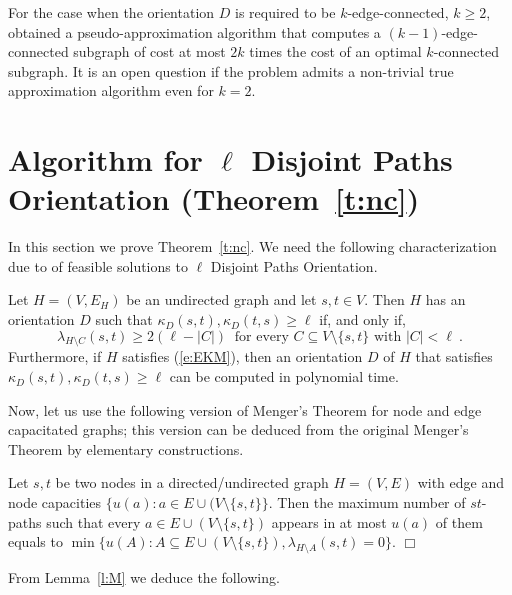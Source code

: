 \documentclass[envcountsame]{llncs}
\begin{document}
For the case when the orientation $D$ is required to be 
$k$-edge-connected, $k \geq 2$, \cite{KNS} obtained a pseudo-approximation algorithm 
that computes a $(k-1)$-edge-connected subgraph of cost at most $2k$ times the cost 
of an optimal $k$-connected subgraph.
It is an open question if the problem admits a non-trivial true approximation 
algorithm even for $k=2$.

\section{Algorithm for {\sf $\ell$ Disjoint Paths Orientation} (Theorem~\ref{t:nc})} \label{s:nc}

In this section we prove Theorem~\ref{t:nc}.
We need the following characterization due to \cite{EKM} 
of feasible solutions to {\sf $\ell$ Disjoint Paths Orientation}.

\begin{theorem}  \label{t:EKM}
Let $H=(V,E_H)$ be an undirected graph and let $s,t \in V$. 
Then $H$ has an orientation $D$ such that 
$\kappa_D(s,t),\kappa_D(t,s) \geq \ell$ if, and only if,
\begin{equation} \label{e:EKM}
\lambda_{H \setminus C}(s,t) \geq 2(\ell-|C|) \ \mbox{ for every }  C \subseteq V \setminus \{s,t\} 
\mbox{ with } |C|<\ell \ .
\end{equation}
Furthermore, if $H$ satisfies (\ref{e:EKM}), then an orientation $D$ of $H$
that satisfies \\ 
$\kappa_D(s,t),\kappa_D(t,s) \geq \ell$ can be computed in polynomial time. 
\end{theorem}

Now, let us use the following version of Menger's Theorem for node and edge capacitated graphs;
this version can be deduced from the original Menger's Theorem by elementary constructions.

\begin{lemma} \label{l:M}
Let $s,t$ be two nodes in a directed/undirected graph $H=(V,E)$ with edge and node capacities 
$\{u(a):a \in E \cup (V \setminus \{s,t\}\}$. 
Then the maximum number of $st$-paths such that every $a \in E \cup (V \setminus \{s,t\})$ 
appears in at most $u(a)$ of them equals to
$\min\{u(A): A \subseteq E \cup (V \setminus \{s,t\}), \lambda_{H \setminus A}(s,t)=0\}$. \hfill $\Box$
\end{lemma}

From Lemma~\ref{l:M} we deduce the following.
\end{document}
